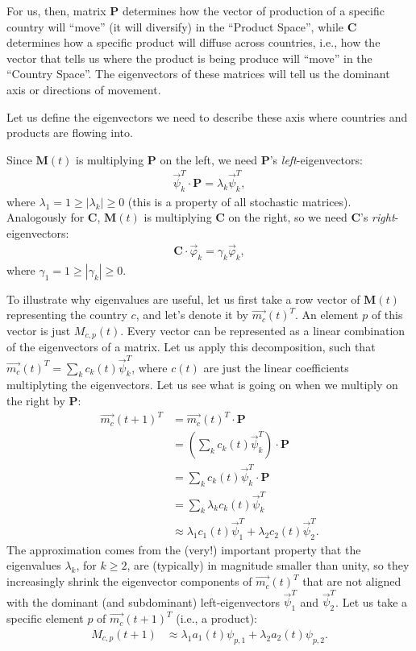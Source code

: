 \documentclass[12pt]{article}
\newcommand{\mtx}[1]{\mathbf{ #1}}
\begin{document}
For us, then, matrix $\mtx{P}$ determines how the vector of production of a specific country will ``move'' (it will diversify) in the ``Product Space'', while $\mtx{C}$ determines how a specific product will diffuse across countries, i.e., how the vector that tells us where the product is being produce will ``move'' in the ``Country Space''. The eigenvectors of these matrices will tell us the dominant axis or directions of movement.

Let us define the eigenvectors we need to describe these axis where countries and products are flowing into. 

Since $\mtx{M}(t)$ is multiplying $\mtx{P}$ on the left, we need $\mtx{P}$'s \emph{left}-eigenvectors:
\begin{align}
	\vec{\psi}_k^T \cdot\mtx{P} = \lambda_k \vec{\psi}_k^T,
\end{align}
where $\lambda_1 = 1 \geq \left|\lambda_k\right| \geq 0$ (this is a property of all stochastic matrices). Analogously for $\mtx{C}$, $\mtx{M}(t)$ is multiplying $\mtx{C}$ on the right, so we need $\mtx{C}$'s \emph{right}-eigenvectors:
\begin{align}
	\mtx{C}\cdot \vec{\varphi}_k = \gamma_k \vec{\varphi}_k,
\end{align}
where $\gamma_1 = 1 \geq \left|\gamma_k\right| \geq 0$.

To illustrate why eigenvalues are useful, let us first take a row vector of $\mtx{M}(t)$ representing the country $c$, and let's denote it by $\vec{m_c}(t)^T$. An element $p$ of this vector is just $M_{c,p}(t)$. Every vector can be represented as a linear combination of the eigenvectors of a matrix. Let us apply this decomposition, such that $\vec{m_c}(t)^T=\sum_k c_k(t) \vec{\psi}_k^T$, where $c(t)$ are just the linear coefficients multiplyting the eigenvectors. Let us see what is going on when we multiply on the right by $\mtx{P}$:
\begin{align*}
	\vec{m_c}(t+1)^T &= \vec{m_c}(t)^T\cdot\mtx{P} \\
	&= \left(\sum_k c_k(t) \vec{\psi}_k^T \right)\cdot\mtx{P} \\
	&= \sum_k c_k(t) \vec{\psi}_k^T \cdot\mtx{P} \\
	&= \sum_k \lambda_k c_k(t) \vec{\psi}_k^T  \\
	&\approx \lambda_1 c_1(t) \vec{\psi}_1^T + \lambda_2 c_2(t) \vec{\psi}_2^T.
\end{align*}
The approximation comes from the (very!) important property that the eigenvalues $\lambda_k$, for $k\geq 2$, are (typically) in magnitude smaller than unity, so they increasingly shrink the eigenvector components of $\vec{m_c}(t)^T$ that are not aligned with the dominant (and subdominant) left-eigenvectors $\vec{\psi}_1^T$ and $\vec{\psi}_2^T$. Let us take a specific element $p$ of $\vec{m_c}(t+1)^T$ (i.e., a product):
\begin{align*}
	M_{c,p}(t+1) &\approx \lambda_1 a_1(t) \psi_{p,1} + \lambda_2 a_2(t) \psi_{p,2}.
\end{align*}
\end{document}
